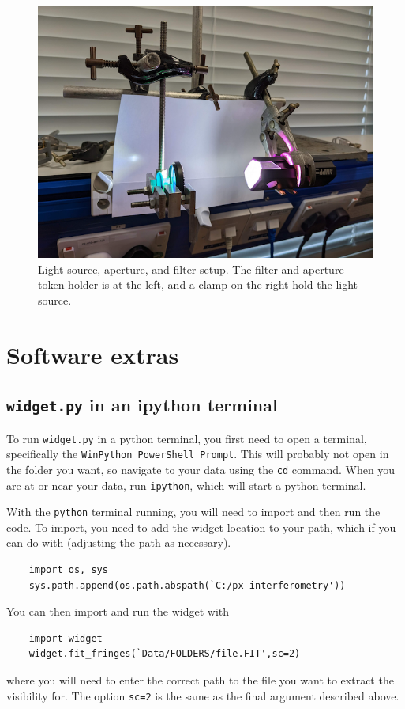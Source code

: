 \documentclass[11pt]{article}
\begin{document}
\begin{figure}[h]
    \centering
    \includegraphics[width=1\textwidth]{doc/source.png}
    \caption{Light source, aperture, and filter setup. The filter and aperture token holder is at the left, and a clamp on the right hold the light source.}
    \label{fig:tel2}
\end{figure}

\clearpage

\section{Software extras}

\subsection{\texttt{widget.py} in an ipython terminal}

To run \texttt{widget.py} in a python terminal, you first need to open a terminal, specifically the \texttt{WinPython PowerShell Prompt}. This will probably not open in the folder you want, so navigate to your data using the \texttt{cd} command. When you are at or near your data, run \texttt{ipython}, which will start a python terminal.

With the \texttt{python} terminal running, you will need to import and then run the code. To import, you need to add the widget location to your path, which if you can do with (adjusting the path as necessary).
\begin{verbatim}
    import os, sys
    sys.path.append(os.path.abspath(`C:/px-interferometry'))
\end{verbatim}
You can then import and run the widget with
\begin{verbatim}
    import widget
    widget.fit_fringes(`Data/FOLDERS/file.FIT',sc=2)
\end{verbatim}
where you will need to enter the correct path to the file you want to extract the visibility for. The option \texttt{sc=2} is the same as the final argument described above.


\clearpage



\end{document}

